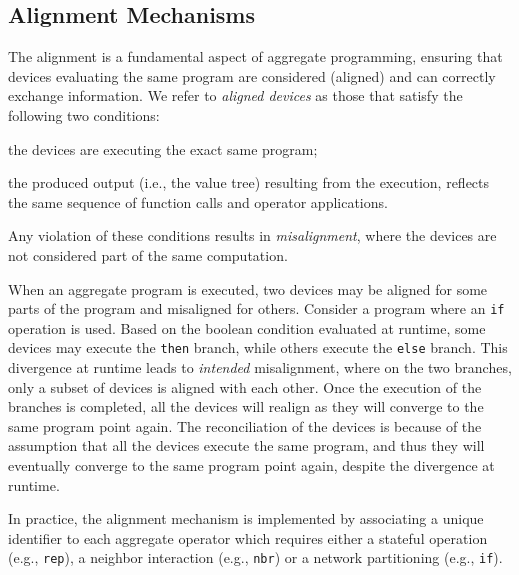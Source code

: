 \documentclass[runningheads]{llncs}
\begin{document}
\subsection{Alignment Mechanisms}\label{sec:alignment}
The alignment is a fundamental aspect of aggregate programming,
ensuring that devices evaluating the same program are considered (aligned) and can correctly exchange information.
%
We refer to \emph{aligned devices} as those that satisfy the following two conditions:
\begin{enumerate*}[label=(\roman*)]
    \item the devices are executing the exact same program;
    \item the produced output (i.e., the value tree) resulting from the execution, reflects the same sequence of function calls and operator applications.
\end{enumerate*}
Any violation of these conditions results in \emph{misalignment}, 
where the devices are not considered part of the same computation.

When an aggregate program is executed,
two devices may be aligned for some parts of the program and misaligned for others.
%
Consider a program where an \texttt{if} operation is used.
%
Based on the boolean condition evaluated at runtime,
some devices may execute the \texttt{then} branch, 
while others execute the \texttt{else} branch.
%
This divergence at runtime leads to \emph{intended} misalignment,
where on the two branches,
only a subset of devices is aligned with each other.
%
Once the execution of the branches is completed,
all the devices will realign as they will converge to the same program point again.
%
The reconciliation of the devices is because of the assumption that all the devices execute the same program, 
and thus they will eventually converge to the same program point again,
despite the divergence at runtime.

In practice,
the alignment mechanism is implemented by associating a unique identifier to each aggregate operator which requires either a stateful operation (e.g., \texttt{rep}),
a neighbor interaction (e.g., \texttt{nbr})
or a network partitioning (e.g., \texttt{if}).
%
\end{document}

